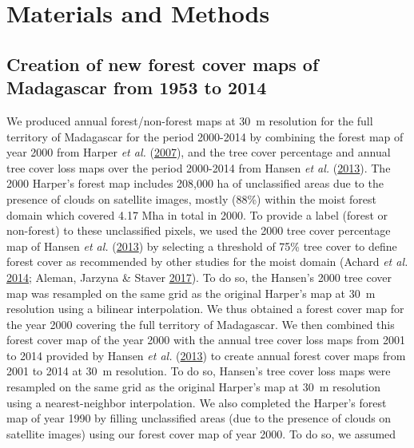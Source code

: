 \documentclass[]{article}
\theoremstyle{definition}
\theoremstyle{definition}
\theoremstyle{definition}
\theoremstyle{remark}
\begin{document}
\hypertarget{materials-and-methods}{%
\section{Materials and Methods}\label{materials-and-methods}}

\hypertarget{creation-of-new-forest-cover-maps-of-madagascar-from-1953-to-2014}{%
\subsection{Creation of new forest cover maps of Madagascar from 1953 to
2014}\label{creation-of-new-forest-cover-maps-of-madagascar-from-1953-to-2014}}

We produced annual forest/non-forest maps at 30~m resolution for the
full territory of Madagascar for the period 2000-2014 by combining the
forest map of year 2000 from Harper \emph{et al.}
(\protect\hyperlink{ref-Harper2007}{2007}), and the tree cover
percentage and annual tree cover loss maps over the period 2000-2014
from Hansen \emph{et al.} (\protect\hyperlink{ref-Hansen2013}{2013}).
The 2000 Harper's forest map includes 208,000 ha of unclassified areas
due to the presence of clouds on satellite images, mostly (88\%) within
the moist forest domain which covered 4.17 Mha in total in 2000. To
provide a label (forest or non-forest) to these unclassified pixels, we
used the 2000 tree cover percentage map of Hansen \emph{et al.}
(\protect\hyperlink{ref-Hansen2013}{2013}) by selecting a threshold of
75\% tree cover to define forest cover as recommended by other studies
for the moist domain (Achard \emph{et al.}
\protect\hyperlink{ref-Achard2014}{2014}; Aleman, Jarzyna \& Staver
\protect\hyperlink{ref-Aleman2017}{2017}). To do so, the Hansen's 2000
tree cover map was resampled on the same grid as the original Harper's
map at 30~m resolution using a bilinear interpolation. We thus obtained
a forest cover map for the year 2000 covering the full territory of
Madagascar. We then combined this forest cover map of the year 2000 with
the annual tree cover loss maps from 2001 to 2014 provided by Hansen
\emph{et al.} (\protect\hyperlink{ref-Hansen2013}{2013}) to create
annual forest cover maps from 2001 to 2014 at 30~m resolution. To do so,
Hansen's tree cover loss maps were resampled on the same grid as the
original Harper's map at 30~m resolution using a nearest-neighbor
interpolation. We also completed the Harper's forest map of year 1990 by
filling unclassified areas (due to the presence of clouds on satellite
images) using our forest cover map of year 2000. To do so, we assumed
\end{document}
